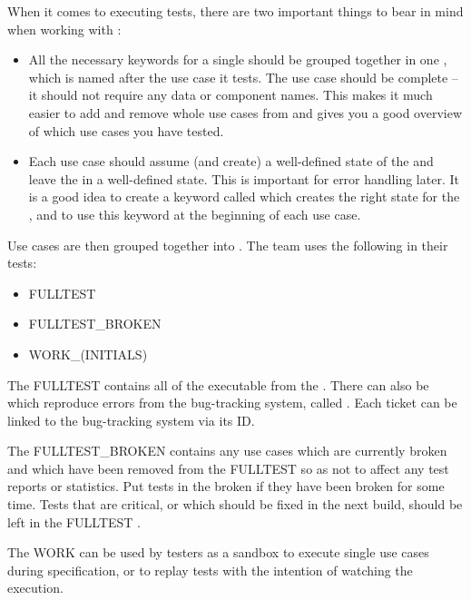 When it comes to executing tests, there are two important things to bear in mind when working with \app{}:
\begin{itemize}
\item All the necessary keywords for a single  should be grouped together in one \gdcase{}, which is named after the use case it tests. The use case should be complete -- it should not require any data or component names. This makes it much easier to add and remove whole use cases from \gdsuites{} and gives you a good overview of which use cases you have tested.   
\item Each use case should assume (and create) a well-defined state of the \gdaut{} and leave the \gdaut{} in a well-defined state. This is important for error handling later. It is a good idea to create a keyword called  which creates the right state for the \gdaut{}, and to use this keyword at the beginning of each use case. 
\end{itemize}


Use cases are then grouped together into \gdsuites{}. The \app{} team uses the following \gdsuites{} in their tests:
\begin{itemize}
\item FULLTEST
\item FULLTEST\_BROKEN
\item WORK\_(INITIALS)
\end{itemize}

The FULLTEST \gdsuite{} contains all of the executable  from the \gdproject{}. There can also be \gdcases{} which reproduce errors from the bug-tracking system, called . Each ticket \gdcase{} can be linked to the bug-tracking system via its ID. 


The FULLTEST\_BROKEN \gdsuite{} contains any use cases which are currently broken and which have been removed from the FULLTEST so as not to affect any test reports or statistics. Put tests in the broken \gdsuite{} if they have been broken for some time. Tests that are critical, or which should be fixed in the next build, should be left in the FULLTEST \gdsuite{}. 

The WORK \gdsuites{} can be used by testers as a sandbox to execute single use cases during specification, or to replay tests with the intention of watching the execution. 
